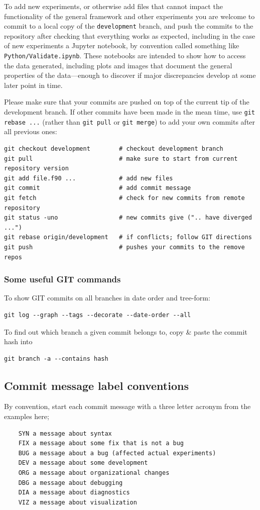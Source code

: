 \documentclass[paper=a4,fontsize=11pt]{scrartcl}
\numberwithin{equation}{section}		%
\numberwithin{figure}{section}			%
\numberwithin{table}{section}				%
\newcommand{\gitcolor}{\color{Brown}}
\newcommand{\filecolor}{\color{NavyBlue}}
\newcommand{\Git}[1]{\texttt{\gitcolor #1}}
\newcommand{\File}[1]{{\filecolor\texttt{#1}}}
\begin{document}
To add new experiments, or otherwise add files that cannot impact the functionality of the general framework and other experiments you are welcome to commit to a local copy of the \Git{development} branch, and push the commits to the repository after checking that everything works as expected, including in the case of new experiments a Jupyter notebook, by convention called something like \File{Python/Validate.ipynb}.  These notebooks are intended to show how to access the data generated, including plots and images that document the general properties of the data---enough to discover if major discrepancies develop at some later point in time.

Please make sure that your commits are pushed on top of the current tip of the development branch.   If other commits have been made in the mean time, use \Git{git rebase ...} (rather than \Git{git pull} or \Git{git merge}) to add your own commits after all previous ones:

{\gitcolor
\begin{verbatim}
git checkout development        # checkout development branch
git pull                        # make sure to start from current repository version
git add file.f90 ...            # add new files
git commit                      # add commit message
git fetch                       # check for new commits from remote repository
git status -uno                 # new commits give (".. have diverged ...")
git rebase origin/development   # if conflicts; follow GIT directions 
git push                        # pushes your commits to the remove repos
\end{verbatim}
}

\subsubsection{Some useful GIT commands}
To show GIT commits on all branches in date order and tree-form:
{\gitcolor\begin{verbatim}
git log --graph --tags --decorate --date-order --all
\end{verbatim}}

\noindent
To find out which branch a given commit belongs to, copy \& paste the commit hash into
{\gitcolor\begin{verbatim}
git branch -a --contains hash
\end{verbatim}}


\subsection{Commit message label conventions}
By convention, start each commit message with a three letter acronym from the examples here;
{\gitcolor\begin{verbatim}
    SYN a message about syntax
    FIX a message about some fix that is not a bug
    BUG a message about a bug (affected actual experiments)
    DEV a message about some development
    ORG a message about organizational changes
    DBG a message about debugging
    DIA a message about diagnostics
    VIZ a message about visualization
\end{verbatim}}
\end{document}
